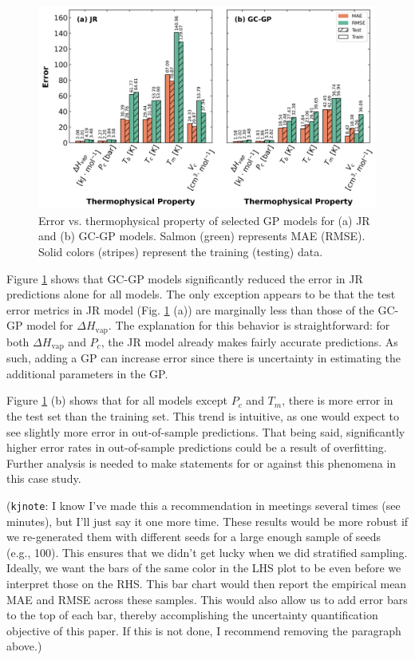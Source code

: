 \documentclass[journal=jacsat,manuscript=article]{achemso}
\newcommand{\kjnote}[1]{{\color{Blue} (\texttt{kjnote}: #1)}}
\begin{document}
\begin{figure}
    \centering
    \includegraphics[width=\linewidth]{images/error_bar_chart_shared_yaxis.png}
    \caption{Error vs. thermophysical property of selected GP models for (a) JR and (b) GC-GP models. Salmon (green) represents MAE (RMSE). Solid colors (stripes) represent the training (testing) data.}
    \label{fig: errorbarchart}
\end{figure}

Figure \ref{fig: errorbarchart} shows that GC-GP models significantly reduced the error in JR predictions alone for all models. The only exception appears to be that the test error metrics in JR model (Fig. \ref{fig: errorbarchart} (a)) are marginally less than those of the GC-GP model for $\Delta H_{\text{vap}}$. The explanation for this behavior is straightforward: for both $\Delta H_{\text{vap}}$ and $P_c$, the JR model already makes fairly accurate predictions. As such, adding a GP can increase error since there is uncertainty in estimating the additional parameters in the GP. 

Figure \ref{fig: errorbarchart} (b) shows that for all models except $P_c$ and $T_m$, there is more error in the test set than the training set. This trend is intuitive, as one would expect to see slightly more error in out-of-sample predictions. That being said, significantly higher error rates in out-of-sample predictions could be a result of overfitting. Further analysis is needed to make statements for or against this phenomena in this case study.

\kjnote{I know I've made this a recommendation in meetings several times (see minutes), but I'll just say it one more time. These results would be more robust if we re-generated them with different seeds for a large enough sample of seeds (e.g., 100). This ensures that we didn't get lucky when we did stratified sampling. Ideally, we want the bars of the same color in the LHS plot to be even before we interpret those on the RHS. This bar chart would then report the empirical mean MAE and RMSE across these samples. This would also allow us to add error bars to the top of each bar, thereby accomplishing the uncertainty quantification objective of this paper. If this is not done, I recommend removing the paragraph above.}
\end{document}

